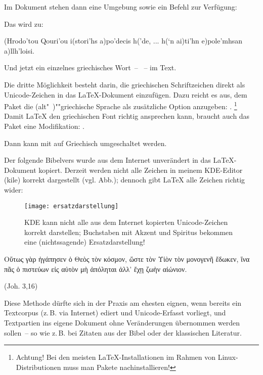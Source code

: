 Im Dokument stehen dann eine Umgebung  sowie ein Befehl 
zur Verfügung:


Das wird zu:

 \begin{ibycus}
  (Hrodo'tou Qouri’ou i(stori’hs a)po’decis h(’de,
  ...
  h(‘n ai)ti’hn e)pole’mhsan a)llh’loisi.
  \end{ibycus}

  Und jetzt ein einzelnes griechisches Wort~-- ~-- im Text.






Die dritte Möglichkeit besteht darin, die griechischen Schriftzeichen direkt als Unicode-Zeichen
in das \LaTeX -Dokument einzufügen. Dazu reicht es aus, dem Paket  die
(alt"~)""griechische Sprache als zusätzliche Option anzugeben:
.
\footnote{Achtung! Bei den meisten \LaTeX-Installationen im Rahmen von Linux-Distributionen muss
man Pakete nachinstallieren!}
Damit \LaTeX{} den griechischen Font richtig ansprechen kann, braucht auch das Paket 
eine Modifikation: .

Dann kann mit  auf Griechisch umgeschaltet werden.

Der folgende Bibelvers wurde aus dem Internet unverändert in das \LaTeX-Dokument
kopiert. Derzeit werden nicht alle Zeichen in meinem KDE-Editor (kile) korrekt dargestellt (vgl. Abb.);
dennoch gibt \LaTeX{} alle Zeichen richtig wider:

\begin{figure}
 \texttt{[image: ersatzdarstellung]}
 \caption{KDE kann nicht alle aus dem Internet kopierten Unicode-Zeichen korrekt darstellen;
 Buchstaben mit Akzent und Spiritus bekommen eine (nichtssagende) Ersatzdarstellung!}
\end{figure}


\begin{otherlanguage}{polutonikogreek}
Οὕτως γὰρ ἠγάπησεν ὁ Θεὸς τὸν κόσμον, ὥστε τὸν Υἱὸν τὸν μονογενῆ ἔδωκεν,
ἵνα πᾶς ὁ πιστεύων εἰς αὐτὸν μὴ ἀπόληται ἀλλ’ ἔχῃ ζωὴν αἰώνιον.
\end{otherlanguage}
(Joh. 3,16)

Diese Methode dürfte sich in der Praxis am ehesten eignen, wenn bereits ein Textcorpus
(z.\,B. via Internet) ediert und Unicode-Erfasst vorliegt, und Textpartien ins eigene Dokument
ohne Veränderungen übernommen werden sollen~-- so wie z.\,B. bei Zitaten aus der Bibel oder
der klassischen Literatur.

